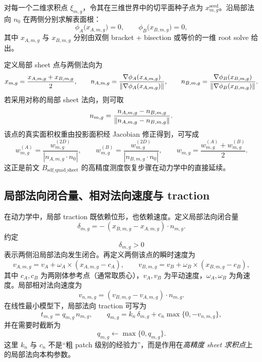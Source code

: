 \documentclass[12pt,a4paper]{ctexart}
\begin{document}
对每一个二维求积点 $\xi_{m,g}$，令其在三维世界中的切平面种子点为 $x_{m,g}^{\mathrm{seed}}$。沿局部法向 $n_0$ 在两侧分别求解表面根：
\begin{equation}
    \phi_A\!\bigl(x_{A,m,g}\bigr)=0,
    \qquad
    \phi_B\!\bigl(x_{B,m,g}\bigr)=0,
\end{equation}
其中 $x_{A,m,g}$ 与 $x_{B,m,g}$ 分别由双侧 bracket + bisection 或等价的一维 root solve 给出。

定义局部 sheet 点与两侧法向为
\begin{equation}
    x_{m,g} = \frac{x_{A,m,g}+x_{B,m,g}}{2},
    \qquad
    n_{A,m,g}=\frac{\nabla \phi_A(x_{A,m,g})}{\norm{\nabla \phi_A(x_{A,m,g})}},
    \qquad
    n_{B,m,g}=\frac{\nabla \phi_B(x_{B,m,g})}{\norm{\nabla \phi_B(x_{B,m,g})}}.
\end{equation}
若采用对称的局部 sheet 法向，则可取
\begin{equation}
    n_{m,g}=\frac{n_{A,m,g}-n_{B,m,g}}{\norm{n_{A,m,g}-n_{B,m,g}}}.
\end{equation}
该点的真实面积权重由投影面积经 Jacobian 修正得到，可写成
\begin{equation}
    w^{(A)}_{m,g} = \frac{w_{m,g}^{(2D)}}{|n_{A,m,g}\cdot n_0|},
    \qquad
    w^{(B)}_{m,g} = \frac{w_{m,g}^{(2D)}}{|n_{B,m,g}\cdot n_0|},
    \qquad
    w_{m,g}=\frac{w^{(A)}_{m,g}+w^{(B)}_{m,g}}{2}.
\end{equation}
这正是前文 $B_{\mathrm{sdf\_quad\_sheet}}$ 的高精度测度恢复步骤在动力学中的直接延续。

\subsection{局部法向闭合量、相对法向速度与 traction}

在动力学中，局部 traction 既依赖位形，也依赖速度。定义局部法向闭合量
\begin{equation}
    \delta_{m,g}= -\,(x_{B,m,g}-x_{A,m,g})\cdot n_{m,g}.
\end{equation}
约定
\begin{equation}
    \delta_{m,g}>0
\end{equation}
表示两侧沿局部法向发生闭合。再定义两侧该点的瞬时速度为
\begin{equation}
    v_{A,m,g}=v_A + \omega_A\times(x_{A,m,g}-c_A),
    \qquad
    v_{B,m,g}=v_B + \omega_B\times(x_{B,m,g}-c_B),
\end{equation}
其中 $c_A,c_B$ 为两刚体参考点（通常取质心），$v_A,v_B$ 为平动速度，$\omega_A,\omega_B$ 为角速度。局部相对法向速度为
\begin{equation}
    v_{n,m,g} = (v_{B,m,g}-v_{A,m,g})\cdot n_{m,g}.
\end{equation}
在线性最小模型下，局部法向 traction 可写为
\begin{equation}
    t_{m,g} = q_{m,g} \, n_{m,g},
    \qquad
    q_{m,g}=k_n\,\delta_{m,g}+c_n\max\{0,-v_{n,m,g}\},
\end{equation}
并在需要时截断为
\begin{equation}
    q_{m,g} \leftarrow \max\{0,q_{m,g}\}.
\end{equation}
这里 $k_n$ 与 $c_n$ 不是“粗 patch 级别的经验力”，而是作用在\emph{高精度 sheet 求积点}上的局部法向本构参数。
\end{document}
